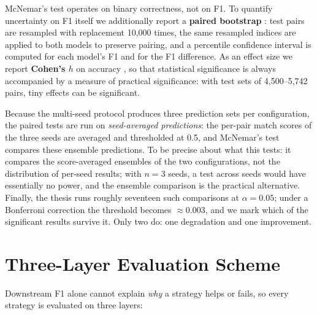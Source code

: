 \documentclass[a4paper,oneside,bibliography=totoc]{scrbook}
\begin{document}
McNemar's test operates on binary correctness, not on F1. To quantify uncertainty on F1 itself we additionally report a \textbf{paired bootstrap} \cite{efron1994introduction}: test pairs are resampled with replacement 10{,}000 times, the same resampled indices are applied to both models to preserve pairing, and a percentile confidence interval is computed for each model's F1 and for the F1 difference. As an effect size we report \textbf{Cohen's $h$} on accuracy \cite{cohen1988statistical}, so that statistical significance is always accompanied by a measure of practical significance: with test sets of 4{,}500--5{,}742 pairs, tiny effects can be significant.

Because the multi-seed protocol produces three prediction sets per configuration, the paired tests are run on \emph{seed-averaged predictions}: the per-pair match scores of the three seeds are averaged and thresholded at 0.5, and McNemar's test compares these ensemble predictions. To be precise about what this tests: it compares the score-averaged ensembles of the two configurations, not the distribution of per-seed results; with $n{=}3$ seeds, a test across seeds would have essentially no power, and the ensemble comparison is the practical alternative. Finally, the thesis runs roughly seventeen such comparisons at $\alpha = 0.05$; under a Bonferroni correction \cite{dunn1961multiple} the threshold becomes $\approx 0.003$, and we mark which of the significant results survive it. Only two do: one degradation and one improvement.

\section{Three-Layer Evaluation Scheme}
\label{sec:setup_layers}

Downstream F1 alone cannot explain \emph{why} a strategy helps or fails, so every strategy is evaluated on three layers:
\end{document}
